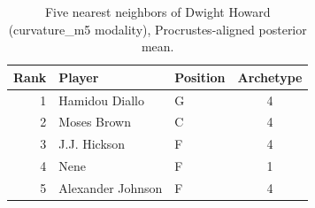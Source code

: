 \begin{table}[htbp]
  \centering\small
  \begin{tabular}{rllc}
    \toprule
    Rank & Player & Position & Archetype \\
    \midrule
    1 & Hamidou Diallo & G & 4 \\
    2 & Moses Brown & C & 4 \\
    3 & J.J. Hickson & F & 4 \\
    4 & Nene & F & 1 \\
    5 & Alexander Johnson & F & 4 \\
    \bottomrule
  \end{tabular}
  \caption{Five nearest neighbors of Dwight Howard (curvature_m5 modality), Procrustes-aligned posterior mean.}
  \label{tab:Dwight_Howard_neighbors_curvature_m5}
\end{table}

